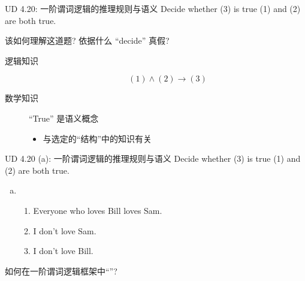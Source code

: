 
\begin{frame}{}
  \begin{exampleblock}{UD 4.20: 一阶谓词逻辑的推理规则与语义}
    Decide whether (3) is true  (1) and (2) are both true.
  \end{exampleblock}

  \pause
  \vspace{0.30cm}
   该如何理解这道题? 依据什么 ``decide'' 真假?
  
  \pause
  \begin{description}
    \item[逻辑知识] 
      \[
	(1) \land (2) \to (3)
      \]
    \pause
    \item[数学知识] ``True'' 是语义概念 
      \begin{itemize}
	\item 与选定的``结构''中的知识有关
      \end{itemize}
  \end{description}

  \pause
\end{frame}

\begin{frame}{}
  \begin{exampleblock}{UD 4.20 (a): 一阶谓词逻辑的推理规则与语义}
    Decide whether (3) is true  (1) and (2) are both true.

    \begin{enumerate}[(a)]
      \item 
	\begin{enumerate}[(1)]
	  \item Everyone who loves Bill loves Sam.
	  \item I don't love Sam.
	  \item I don't love Bill.
	\end{enumerate}
    \end{enumerate}
  \end{exampleblock}

  \vspace{0.50cm}
  \pause
  \begin{center}
    { 如何在一阶谓词逻辑框架中``''?}
  \end{center}
\end{frame}

